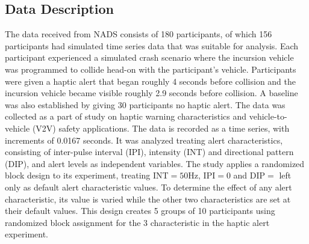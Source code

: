 \documentclass{article}
\begin{document}
\subsection{Data Description}
The data received from NADS consists of 180 participants, of which 156 participants had simulated time series data that was suitable for analysis. Each participant experienced a simulated crash scenario where the incursion vehicle was programmed to collide head-on with the participant's vehicle. Participants were given a haptic alert that began roughly 4 seconds before collision and the incursion vehicle became visible roughly 2.9 seconds before collision. A baseline was also established by giving 30 participants no haptic alert. The data was collected as a part of study on haptic warning characteristics and vehicle-to-vehicle (V2V) safety applications. The data is recorded as a time series, with increments of 0.0167 seconds. It was analyzed treating alert characteristics, consisting of inter-pulse interval (IPI), intensity (INT) and directional pattern (DIP), and alert levels as independent variables. The study applies a randomized block design to its experiment, treating INT$= 50$Hz, IPI$= 0$ and DIP$=$ left only as default alert characteristic values. To determine the effect of any alert characteristic, its value is varied while the other two characteristics are set at their default values. This design creates 5 groups of 10 participants using randomized block assignment for the 3 characteristic in the haptic alert experiment.
\end{document}
